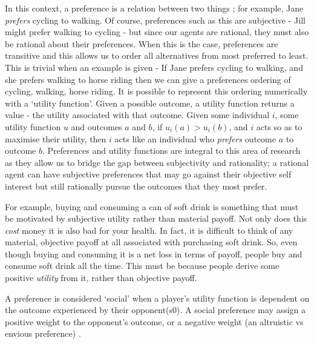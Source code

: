 \documentclass[11pt]{book}
\newcommand*{\np}{\par\noindent\newline}
\begin{document}
\np In this context, a preference is a relation between two things \citep{angner_course_2012}; for example, Jane \textit{prefers} cycling to walking. 
Of course, preferences such as this are subjective - Jill might prefer walking to cycling - but since our agents are rational, they must also be rational about their preferences. 
When this is the case, preferences are transitive and this allows us to order all alternatives from most preferred to least. 
This is trivial when an example is given - If Jane prefers cycling to walking, and she prefers walking to horse riding then we can give a preferences ordering of cycling, walking, horse riding.
It is possible to represent this ordering numerically with a `utility function'.
Given a possible outcome, a utility function returns a value - the utility associated with that outcome.
Given some individual $i$, some utility function $u$ and outcomes $a$ and $b$, 
if $u_i(a) > u_i(b)$, and $i$ acts so as to maximise their utility, then $i$ acts like an individual who \textit{prefers} outcome $a$ to outcome $b$.
Preferences and utility functions are integral to this area of research as they allow us to bridge the gap between subjectivity and rationality; 
a rational agent can have subjective preferences that may go against their objective self interest but still rationally pursue the outcomes that they most prefer.

\np For example, buying and consuming a can of soft drink is something that must be motivated by subjective utility rather than material payoff. 
Not only does this \textit{cost} money it is also bad for your health. 
In fact, it is difficult to think of any material, objective payoff at all associated with purchasing soft drink. 
So, even though buying and consuming it is a net loss in terms of payoff, people buy and consume soft drink all the time. 
This must be because people derive some positive \textit{utility} from it, rather than objective payoff.

\np A preference is considered `social' when a player's utility function is dependent on the outcome experienced by their opponent(s0). 
A social preference may assign a positive weight to the opponent's outcome, or a negative weight (an altruistic vs envious preference) \cite{angner_course_2012}.
\end{document}
